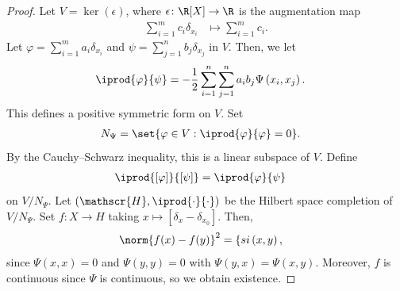 \documentclass[10pt]{mypackage}
\begin{document}
\begin{proof}
  Let $V = \ker\left( \epsilon \right)$, where $\epsilon\colon \R[X]\to \R$ is the augmentation map
  \begin{align*}
    \sum_{i=1}^{m}c_i\delta_{x_i} &\mapsto \sum_{i=1}^{m}c_i.
  \end{align*}
  Let $\varphi = \sum_{i=1}^{m}a_i\delta_{x_i}$ and $\psi = \sum_{j=1}^{n}b_j\delta_{x_j}$ in $V$. Then, we let
  \begin{align*}
    \iprod{\varphi}{\psi} &= -\frac{1}{2}\sum_{i=1}^{n}\sum_{j=1}^{n}a_ib_j\Psi\left( x_i,x_j \right).
  \end{align*}
  This defines a positive symmetric form on $V$. Set
  \begin{align*}
    N_{\Psi} &= \set{\varphi\in V : \iprod{\varphi}{\varphi} = 0}.
  \end{align*}
  By the Cauchy--Schwarz inequality, this is a linear subspace of $V$. Define
  \begin{align*}
    \iprod{\left[ \varphi \right]}{\left[ \psi \right]} &= \iprod{\varphi}{\psi}
  \end{align*}
  on $V/N_{\Psi}$. Let $\left( \mathscr{H}, \iprod{\cdot}{\cdot} \right)$ be the Hilbert space completion of $V/N_{\Psi}$. Set $f\colon X\to H$ taking $x\mapsto \left[ \delta_x-\delta_{x_0} \right]$. Then,
  \begin{align*}
    \norm{f(x) - f(y)}^2 &= \{si\left( x,y \right),
  \end{align*}
  since $\Psi\left( x,x \right) = 0$ and $\Psi\left( y,y \right) = 0$ with $\Psi\left( y,x \right) = \Psi\left( x,y \right)$. Moreover, $f$ is continuous since $\Psi$ is continuous, so we obtain existence.


\end{proof}
\end{document}

